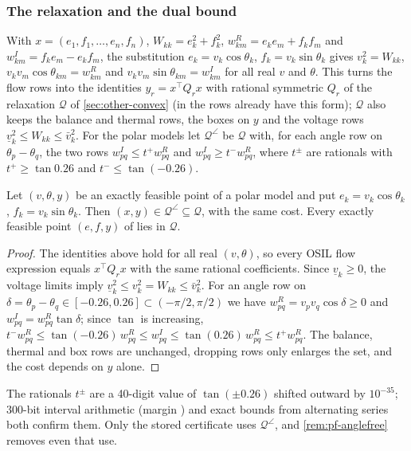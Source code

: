 \subsubsection{The relaxation and the dual bound}\label{app:powerflow-dual}

With $x=(e_1,f_1,\dots,e_n,f_n)$, $W_{kk}=e_k^2+f_k^2$, $w^R_{km}=e_ke_m+f_kf_m$ and $w^I_{km}=f_ke_m-e_kf_m$, the substitution $e_k=v_k\cos\theta_k$, $f_k=v_k\sin\theta_k$ gives $v_k^2=W_{kk}$, $v_kv_m\cos\theta_{km}=w^R_{km}$ and $v_kv_m\sin\theta_{km}=w^I_{km}$ for all real $v$ and $\theta$.
This turns the flow rows into the identities $y_r=x^\top Q_rx$ with rational symmetric $Q_r$ of the relaxation $\mathcal Q$ of \cref{sec:other-convex} (in  the rows already have this form); $\mathcal Q$ also keeps the balance and thermal rows, the boxes on $y$ and the voltage rows $\underline v_k^2\le W_{kk}\le\bar v_k^2$.
For the polar models let $\mathcal Q^\angle$ be $\mathcal Q$ with, for each angle row on $\theta_p-\theta_q$, the two rows $w^I_{pq}\le t^+w^R_{pq}$ and $w^I_{pq}\ge t^-w^R_{pq}$, where $t^\pm$ are rationals with $t^+\ge\tan0.26$ and $t^-\le\tan(-0.26)$.

\begin{lemma}\label{lem:pf-relaxation}
Let $(v,\theta,y)$ be an exactly feasible point of a polar model and put $e_k=v_k\cos\theta_k$, $f_k=v_k\sin\theta_k$.
Then $(x,y)\in\mathcal Q^\angle\subseteq\mathcal Q$, with the same cost.
Every exactly feasible point $(e,f,y)$ of  lies in $\mathcal Q$.
\end{lemma}

\begin{proof}
The identities above hold for all real $(v,\theta)$, so every OSIL flow expression equals $x^\top Q_rx$ with the same rational coefficients.
Since $\underline v_k\ge0$, the voltage limits imply $\underline v_k^2\le v_k^2=W_{kk}\le\bar v_k^2$.
For an angle row on $\delta=\theta_p-\theta_q\in[-0.26,0.26]\subset(-\pi/2,\pi/2)$ we have $w^R_{pq}=v_pv_q\cos\delta\ge0$ and $w^I_{pq}=w^R_{pq}\tan\delta$;
since $\tan$ is increasing, $t^-w^R_{pq}\le\tan(-0.26)\,w^R_{pq}\le w^I_{pq}\le\tan(0.26)\,w^R_{pq}\le t^+w^R_{pq}$.
The balance, thermal and box rows are unchanged, dropping rows only enlarges the set, and the cost depends on $y$ alone.
\end{proof}

The rationals $t^\pm$ are a 40-digit value of $\tan(\pm0.26)$ shifted outward by $10^{-35}$; 300-bit interval arithmetic (margin ) and exact bounds from alternating series both confirm them.
Only the stored  certificate uses $\mathcal Q^\angle$, and \cref{rem:pf-anglefree} removes even that use.

